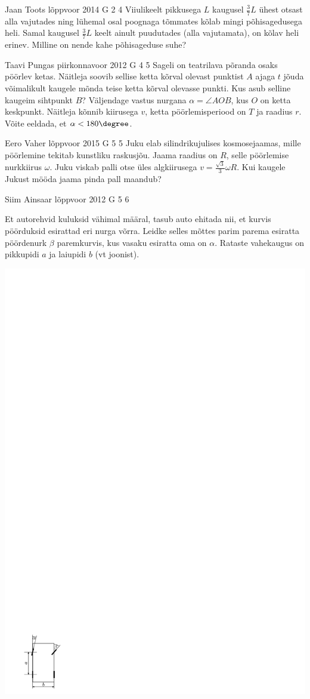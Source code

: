 \documentclass[11pt, twoside]{article}
\begin{document}
{%
{Jaan Toots} %
{lõppvoor} %
{2014} %
{G 2} %
{4} %
{
\ifStatement
Viiulikeelt pikkusega $L$ kaugusel $\frac{3}{7}L$ ühest otsast alla vajutades ning lühemal osal poognaga tõmmates kõlab mingi põhisagedusega heli. Samal kaugusel $\frac{3}{7}L$ keelt ainult puudutades (alla vajutamata), on kõlav heli erinev. Milline on nende kahe põhisageduse suhe?
\fi
}

{Taavi Pungas} %
{piirkonnavoor} %
{2012} %
{G 4} %
{5} %
{
\ifStatement
Sageli on teatrilava põranda osaks pöörlev ketas. Näitleja soovib sellise ketta
kõrval olevast punktist $A$ ajaga $t$ jõuda võimalikult kaugele mõnda teise ketta
kõrval olevasse punkti. Kus asub selline kaugeim sihtpunkt $B$? Väljendage vastus nurgana
$\alpha = \angle \mathit{AOB}$, kus $O$ on ketta keskpunkt. Näitleja kõnnib
kiirusega $v$, ketta pöörlemisperiood on $T$ ja raadius $r$. Võite eeldada, et $\alpha < 180\degree$.
\fi
}

{Eero Vaher} %
{lõppvoor} %
{2015} %
{G 5} %
{5} %
{
\ifStatement
Juku elab silindrikujulises kosmosejaamas, mille pöörlemine tekitab kunstliku raskusjõu. Jaama raadius on $R$, selle pöörlemise nurkkiirus $\omega$. Juku viskab palli otse üles algkiirusega $v=\frac{\sqrt{3}}{3}\omega R$. Kui kaugele Jukust mööda jaama pinda pall maandub?
\fi
}

{Siim Ainsaar} %
{lõppvoor} %
{2012} %
{G 5} %
{6} %
{
\ifStatement
Et autorehvid kuluksid vähimal määral, tasub auto ehitada nii, et kurvis
pöörduksid esirattad eri nurga võrra. Leidke selles mõttes parim parema
esiratta pöördenurk $\beta$ paremkurvis, kus
vasaku esiratta oma on $\alpha$. Rataste vahekaugus on pikkupidi $a$ ja laiupidi
$b$ (vt joonist).
\begin{center}
\includegraphics[width=0.3\linewidth]{2012-v3g-05-r_yl_joonis}%
\end{center}
\fi
}

}
\end{document}
